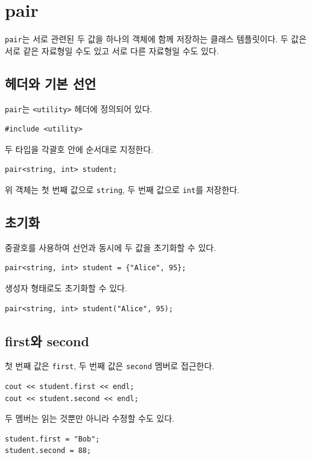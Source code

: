 \documentclass[11pt,a4paper]{article}
\begin{document}
\section{pair}
\texttt{pair}는 서로 관련된 두 값을 하나의 객체에 함께 저장하는 클래스 템플릿이다. 두 값은 서로 같은 자료형일 수도 있고 서로 다른 자료형일 수도 있다.

\subsection{헤더와 기본 선언}
\texttt{pair}는 \texttt{<utility>} 헤더에 정의되어 있다.

\begin{lstlisting}
#include <utility>
\end{lstlisting}

두 타입을 각괄호 안에 순서대로 지정한다.

\begin{lstlisting}
pair<string, int> student;
\end{lstlisting}

위 객체는 첫 번째 값으로 \texttt{string}, 두 번째 값으로 \texttt{int}를 저장한다.

\subsection{초기화}
중괄호를 사용하여 선언과 동시에 두 값을 초기화할 수 있다.

\begin{lstlisting}
pair<string, int> student = {"Alice", 95};
\end{lstlisting}

생성자 형태로도 초기화할 수 있다.

\begin{lstlisting}
pair<string, int> student("Alice", 95);
\end{lstlisting}

\subsection{first와 second}
첫 번째 값은 \texttt{first}, 두 번째 값은 \texttt{second} 멤버로 접근한다.

\begin{lstlisting}
cout << student.first << endl;
cout << student.second << endl;
\end{lstlisting}

두 멤버는 읽는 것뿐만 아니라 수정할 수도 있다.

\begin{lstlisting}
student.first = "Bob";
student.second = 88;
\end{lstlisting}
\end{document}
